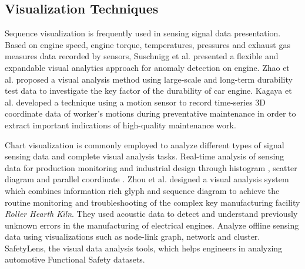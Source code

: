 \documentclass[a4paper,fleqn]{cas-dc}
\begin{document}
\subsection{Visualization Techniques}
Sequence visualization is frequently used in sensing signal data presentation.
Based on engine speed, engine torque, temperatures, pressures and exhaust gas measures data recorded by sensors, Suschnigg et al. \cite{suschnigg2020exploration} presented a flexible and expandable visual analytics approach for anomaly detection on engine.
Zhao et al. \cite{zhao2019visual} proposed a visual analysis method using large-scale and long-term durability test data to investigate the key factor of the durability of car engine.
Kagaya et al. \cite{Kagaya2017} developed a technique using a motion sensor to record time-series 3D coordinate data of worker's motions during preventative maintenance in order to extract important indications of high-quality maintenance work.

Chart visualization is commonly employed to analyze different types of signal sensing data and complete visual analysis tasks. 
Real-time analysis of sensing data for production monitoring and industrial design through histogram \cite{eirich2021irvine,Zhou2018}, scatter diagram \cite{cibulski2020paved,eirich2021irvine} and parallel coordinate \cite{cibulski2020paved}.
Zhou et al. \cite{Zhou2018} designed a visual analysis system which combines information rich glyph and sequence diagram to achieve the routine monitoring and troubleshooting of the complex key manufacturing facility \textit{Roller Hearth Kiln}.
They \cite{eirich2021irvine} used acoustic data to detect and understand previously unknown errors in the manufacturing of electrical engines.
Analyze offline sensing data using visualizations such as node-link graph\cite{Wang2022}, network and cluster\cite{narechania2020safetylens}.
SafetyLens\cite{narechania2020safetylens}, the visual data analysis tools, which helps engineers in analyzing automotive Functional Safety datasets.
\end{document}
